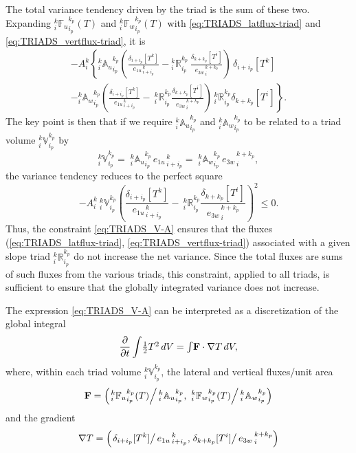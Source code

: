 \documentclass[../main/NEMO_manual]{subfiles}
\begin{document}
The total variance tendency driven by the triad is the sum of these two.
Expanding $_i^k{\mathbb{F}_u}_{i_p}^{k_p} (T)$ and $_i^k{\mathbb{F}_w}_{i_p}^{k_p} (T)$ with
\autoref{eq:TRIADS_latflux-triad} and \autoref{eq:TRIADS_vertflux-triad}, it is
\begin{multline*}
  -{A}_i^k\left \{
    { } _i^k{\mathbb{A}_u}_{i_p}^{k_p}
    \left(
      \frac{ \delta_{i+ i_p}[T^k] }{ {e_{1u}}_{\,i + i_p}^{\,k} }
      - {_i^k\mathbb{R}_{i_p}^{k_p}} \
      \frac{ \delta_{k+k_p} [T^i] }{{e_{3w}}_{\,i}^{\,k+k_p} }\right)\,\delta_{i+ i_p}[T^k] \right.\\
  - \left. { } _i^k{\mathbb{A}_w}_{i_p}^{k_p}
    \left(
      \frac{ \delta_{i+ i_p}[T^k] }{ {e_{1u}}_{\,i + i_p}^{\,k} }
      -{\:}_i^k\mathbb{R}_{i_p}^{k_p}
      \frac{ \delta_{k+k_p} [T^i] }{{e_{3w}}_{\,i}^{\,k+k_p} }
    \right) {\,}_i^k\mathbb{R}_{i_p}^{k_p}\delta_{k+ k_p}[T^i]
  \right \}.
\end{multline*}
The key point is then that if we require $_i^k{\mathbb{A}_u}_{i_p}^{k_p}$ and $_i^k{\mathbb{A}_w}_{i_p}^{k_p}$ to
be related to a triad volume $_i^k\mathbb{V}_{i_p}^{k_p}$ by
\begin{equation}
  \label{eq:TRIADS_V-A}
  _i^k\mathbb{V}_{i_p}^{k_p}
  ={\;}_i^k{\mathbb{A}_u}_{i_p}^{k_p}\,{e_{1u}}_{\,i + i_p}^{\,k}
  ={\;}_i^k{\mathbb{A}_w}_{i_p}^{k_p}\,{e_{3w}}_{\,i}^{\,k + k_p},
\end{equation}
the variance tendency reduces to the perfect square
\begin{equation}
  \label{eq:TRIADS_perfect-square}
  -{A}_i^k{\:} _i^k\mathbb{V}_{i_p}^{k_p}
  \left(
    \frac{ \delta_{i+ i_p}[T^k] }{ {e_{1u}}_{\,i + i_p}^{\,k} }
    -{\:}_i^k\mathbb{R}_{i_p}^{k_p}
    \frac{ \delta_{k+k_p} [T^i] }{{e_{3w}}_{\,i}^{\,k+k_p} }
  \right)^2\leq 0.
\end{equation}
Thus, the constraint \autoref{eq:TRIADS_V-A} ensures that the fluxes
(\autoref{eq:TRIADS_latflux-triad}, \autoref{eq:TRIADS_vertflux-triad}) associated with
a given slope triad $_i^k\mathbb{R}_{i_p}^{k_p}$ do not increase the net variance.
Since the total fluxes are sums of such fluxes from the various triads, this constraint, applied to all triads,
is sufficient to ensure that the globally integrated variance does not increase.

The expression \autoref{eq:TRIADS_V-A} can be interpreted as a discretization of the global integral
\begin{equation}
  \label{eq:TRIADS_cts-var}
  \frac{\partial}{\partial t}\int\!\textstyle \frac{1}{2} T^2\, dV =
  \int\!\mathbf{F}\cdot\nabla T\, dV,
\end{equation}
where, within each triad volume $_i^k\mathbb{V}_{i_p}^{k_p}$, the lateral and vertical fluxes/unit area
\[
  \mathbf{F}=\left(
    \left.{}_i^k{\mathbb{F}_u}_{i_p}^{k_p} (T)\right/{}_i^k{\mathbb{A}_u}_{i_p}^{k_p},
    \left.{\:}_i^k{\mathbb{F}_w}_{i_p}^{k_p} (T)\right/{}_i^k{\mathbb{A}_w}_{i_p}^{k_p}
  \right)
\]
and the gradient
\[
  \nabla T = \left(
    \left.\delta_{i+ i_p}[T^k] \right/ {e_{1u}}_{\,i + i_p}^{\,k},
    \left.\delta_{k+ k_p}[T^i] \right/ {e_{3w}}_{\,i}^{\,k + k_p}
  \right)
\]
\end{document}
